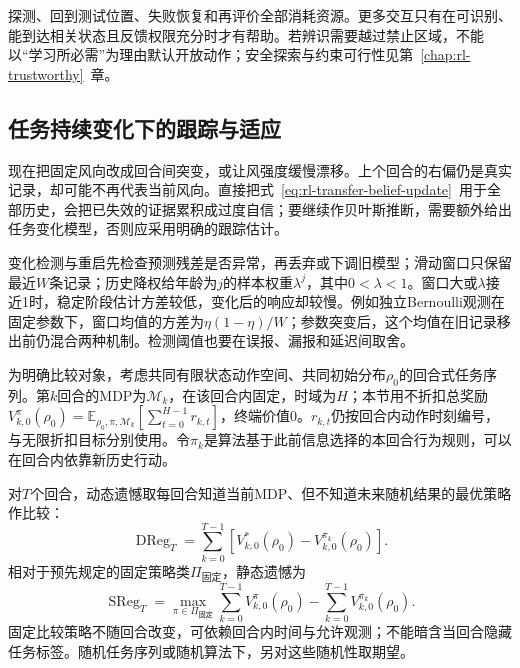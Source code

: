 探测、回到测试位置、失败恢复和再评价全部消耗资源。更多交互只有在可识别、能到达相关状态且反馈权限充分时才有帮助。若辨识需要越过禁止区域，不能以“学习所必需”为理由默认开放动作；安全探索与约束可行性见第~\ref{chap:rl-trustworthy}~章。

\subsection{任务持续变化下的跟踪与适应}
\label{sec:rl-transfer-tracking}

现在把固定风向改成回合间突变，或让风强度缓慢漂移。上个回合的右偏仍是真实记录，却可能不再代表当前风向。直接把式~\eqref{eq:rl-transfer-belief-update}~用于全部历史，会把已失效的证据累积成过度自信；要继续作贝叶斯推断，需要额外给出任务变化模型，否则应采用明确的跟踪估计。

变化检测与重启先检查预测残差是否异常，再丢弃或下调旧模型；滑动窗口只保留最近$W$条记录；历史降权给年龄为$j$的样本权重$\lambda^j$，其中$0<\lambda<1$。窗口大或$\lambda$接近1时，稳定阶段估计方差较低，变化后的响应却较慢。例如独立Bernoulli观测在固定参数下，窗口均值的方差为$\eta(1-\eta)/W$；参数突变后，这个均值在旧记录移出前仍混合两种机制。检测阈值也要在误报、漏报和延迟间取舍。

为明确比较对象，考虑共同有限状态动作空间、共同初始分布$\rho_0$的回合式任务序列。第$k$回合的MDP为$\mathcal M_k$，在该回合内固定，时域为$H$；本节用不折扣总奖励
$V_{k,0}^{\pi}(\rho_0)=\mathbb E_{\rho_0,\pi,\mathcal M_k}
[\sum_{t=0}^{H-1}r_{k,t}]$，终端价值0。$r_{k,t}$仍按回合内动作时刻编号，与无限折扣目标分别使用。令$\pi_k$是算法基于此前信息选择的本回合行为规则，可以在回合内依靠新历史行动。

\begin{definition}[动态遗憾与静态遗憾]
 \label{def:rl-transfer-regret}
 对$T$个回合，动态遗憾取每回合知道当前MDP、但不知道未来随机结果的最优策略作比较：
 \begin{equation}
 \operatorname{DReg}_T
 =\sum_{k=0}^{T-1}\left[
 V_{k,0}^{*}(\rho_0)-V_{k,0}^{\pi_k}(\rho_0)\right].
 \label{eq:rl-transfer-dynamic-regret}
 \end{equation}
 相对于预先规定的固定策略类$\Pi_{\text{固定}}$，静态遗憾为
 \begin{equation}
 \operatorname{SReg}_T
 =\max_{\pi\in\Pi_{\text{固定}}}
       \sum_{k=0}^{T-1}V_{k,0}^{\pi}(\rho_0)
       -\sum_{k=0}^{T-1}V_{k,0}^{\pi_k}(\rho_0).
 \label{eq:rl-transfer-static-regret}
 \end{equation}
 固定比较策略不随回合改变，可依赖回合内时间与允许观测；不能暗含当回合隐藏任务标签。随机任务序列或随机算法下，另对这些随机性取期望。
\end{definition}

